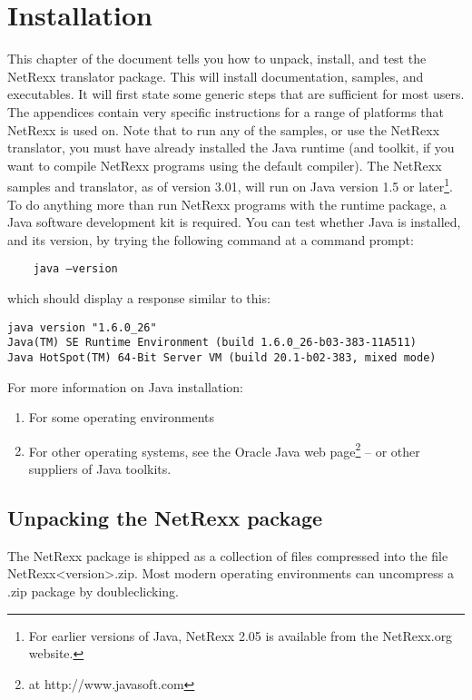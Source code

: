 \chapter{Installation}
This chapter of the document tells you how to unpack, install, and test the NetRexx translator package. This will install documentation, samples, and executables. It will first state some generic steps that are sufficient for most users. The appendices contain very specific instructions for a range of platforms that NetRexx is used on. 
Note that to run any of the samples, or use the NetRexx translator, you must have already installed the Java runtime (and toolkit, if you want to compile NetRexx programs using the default compiler). 
The NetRexx samples and translator, as of version 3.01, will run on 
Java version 1.5 or later\footnote{For earlier versions of Java, NetRexx 2.05 is available from the NetRexx.org website.}. To do anything more than run NetRexx programs with the runtime package, a Java software development kit is required. You can test whether Java is installed, and its version, by trying the following command at a command prompt:
\begin{verbatim} 
    java –version
\end{verbatim}
which should display a response similar to this:
\small
\begin{verbatim} 
java version "1.6.0_26"
Java(TM) SE Runtime Environment (build 1.6.0_26-b03-383-11A511)
Java HotSpot(TM) 64-Bit Server VM (build 20.1-b02-383, mixed mode)
\end{verbatim}
\large
For more information on Java installation:
\begin{enumerate} 
\item For some operating environments
\item For other operating systems, see the Oracle Java web page\footnote{at http://www.javasoft.com} – or other suppliers of Java toolkits.
\end{enumerate}
\section{Unpacking the NetRexx package}
The NetRexx package is shipped as a collection of files compressed into the file NetRexx<version>.zip. 
Most modern operating environments can uncompress a .zip package by doubleclicking.
